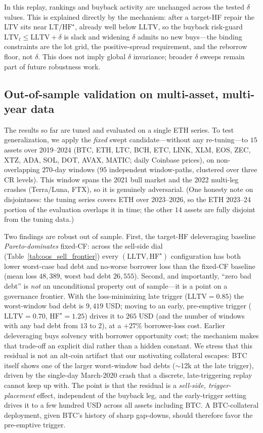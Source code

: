 \documentclass[12pt]{article}
\begin{document}
In this replay, rankings and buyback activity are unchanged across the tested $\delta$ values. This is explained directly by the mechanism: after a target-HF repair the LTV sits near $\mathrm{LT}/\mathrm{HF}^{\star}$, already well below $\mathrm{LLTV}$, so the buyback risk-guard $\mathrm{LTV}_t\le\mathrm{LLTV}+\delta$ is slack and widening $\delta$ admits no new buys---the binding constraints are the lot grid, the positive-spread requirement, and the reborrow floor, not $\delta$. This does not imply global $\delta$ invariance; broader $\delta$ sweeps remain part of future robustness work.

\subsection{Out-of-sample validation on multi-asset, multi-year data}
\label{sec:oos}
The results so far are tuned and evaluated on a single ETH series. To test generalization, we apply the \emph{fixed} swept candidate---without any re-tuning---to $15$ assets over 2019--2024 (BTC, ETH, LTC, BCH, ETC, LINK, XLM, EOS, ZEC, XTZ, ADA, SOL, DOT, AVAX, MATIC; daily Coinbase prices), on non-overlapping $270$-day windows ($95$ independent window-paths, clustered over three CR levels). This window spans the 2021 bull market and the 2022 multi-leg crashes (Terra/Luna, FTX), so it is genuinely adversarial. (One honesty note on disjointness: the tuning series covers ETH over 2023--2026, so the ETH 2023--24 portion of the evaluation overlaps it in time; the other $14$ assets are fully disjoint from the tuning data.)

Two findings are robust out of sample. First, the target-HF deleveraging baseline \emph{Pareto-dominates} fixed-CF: across the sell-side dial (Table~\ref{tab:oos_sell_frontier}) every $(\mathrm{LLTV},\mathrm{HF}^{\star})$ configuration has both lower worst-case bad debt and no-worse borrower loss than the fixed-CF baseline (mean loss $48{,}389$, worst bad debt $26{,}555$). Second, and importantly, ``zero bad debt'' is \emph{not} an unconditional property out of sample---it is a point on a governance frontier. With the loss-minimizing late trigger ($\mathrm{LLTV}=0.85$) the worst-window bad debt is $9{,}419$ USD; moving to an early, pre-emptive trigger ($\mathrm{LLTV}=0.70$, $\mathrm{HF}^{\star}=1.25$) drives it to $265$ USD (and the number of windows with any bad debt from $13$ to $2$), at a ${+}27\%$ borrower-loss cost. Earlier deleveraging buys solvency with borrower opportunity cost; the mechanism makes that trade-off an explicit dial rather than a hidden constant. We stress that this residual is not an alt-coin artifact that our motivating collateral escapes: BTC itself shows one of the larger worst-window bad debts ($\sim$12k at the late trigger), driven by the single-day March-2020 crash that a discrete, late-triggering replay cannot keep up with. The point is that the residual is a \emph{sell-side, trigger-placement} effect, independent of the buyback leg, and the early-trigger setting drives it to a few hundred USD across all assets including BTC. A BTC-collateral deployment, given BTC's history of sharp gap-downs, should therefore favor the pre-emptive trigger.
\end{document}
